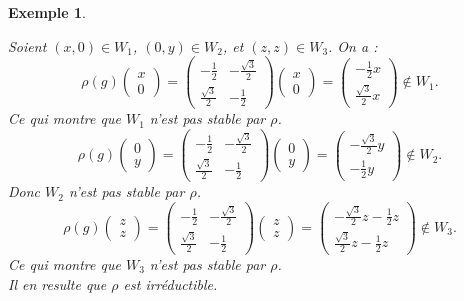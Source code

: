 \documentclass[a4paper, 14pt]{report}
\newtheorem{example}{Exemple}[section]
\begin{document}
\begin{onehalfspace}
{\begin{example}
\begin{enumerate}
					Soient \( (x, 0) \in W_1 \), \( (0, y) \in W_2 \), et \( (z, z) \in W_3 \). On a :
					\[
					\rho(g) \begin{pmatrix} x \\ 0 \end{pmatrix} = 
					\begin{pmatrix} -\frac{1}{2} & -\frac{\sqrt{3}}{2} \\ \frac{\sqrt{3}}{2} & -\frac{1}{2} \end{pmatrix} 
					\begin{pmatrix} x \\ 0 \end{pmatrix} = 
					\begin{pmatrix} -\frac{1}{2}x \\ \frac{\sqrt{3}}{2}x \end{pmatrix}
					\notin W_1.
					\]
					Ce qui montre que \(W_1\) n'est pas stable par \(\rho\).		
					\[
					\rho(g) \begin{pmatrix} 0 \\ y \end{pmatrix} = 
					\begin{pmatrix} -\frac{1}{2} & -\frac{\sqrt{3}}{2} \\ \frac{\sqrt{3}}{2} & -\frac{1}{2} \end{pmatrix} 
					\begin{pmatrix} 0 \\ y \end{pmatrix} = 
					\begin{pmatrix} -\frac{\sqrt{3}}{2}y \\ -\frac{1}{2}y \end{pmatrix}
					\notin W_2.
					\]
					Donc \(W_2\) n'est pas stable par \(\rho\).
					\[
					\rho(g) \begin{pmatrix} z \\ z \end{pmatrix} = 
					\begin{pmatrix} -\frac{1}{2} & -\frac{\sqrt{3}}{2} \\ \frac{\sqrt{3}}{2} & -\frac{1}{2} \end{pmatrix} 
					\begin{pmatrix} z \\ z \end{pmatrix} = 
					\begin{pmatrix} -\frac{\sqrt{3}}{2}z - \frac{1}{2}z \\ \frac{\sqrt{3}}{2}z - \frac{1}{2}z \end{pmatrix}
					\notin W_3.
					\]
					Ce qui montre que \(W_3\) n'est pas stable par \(\rho\).\\
					Il en resulte que \( \rho \) est irréductible.
				\end{enumerate}
			\end{example}
			
}
\end{onehalfspace}
\end{document}
